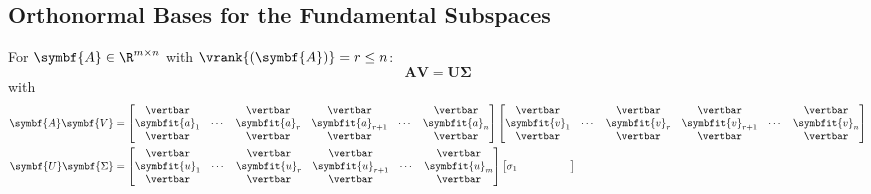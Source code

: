 \documentclass{article}
\begin{document}
\subsection{Orthonormal Bases for the Fundamental Subspaces}
For \(\symbf{A}\in\R^{m \times n}\) with \(\vrank{\left( \symbf{A} \right)} = r \leq n\):
\begin{equation*}
    \symbf{A} \symbf{V} = \symbf{U} \symbf{\Sigma}
\end{equation*}
with
\begin{align*}
    \symbf{A} \symbf{V}      & = \begin{bmatrix}
                                     \vertbar      &        & \vertbar      & \vertbar          &        & \vertbar      \\
                                     \symbfit{a}_1 & \cdots & \symbfit{a}_r & \symbfit{a}_{r+1} & \cdots & \symbfit{a}_n \\
                                     \vertbar      &        & \vertbar      & \vertbar          &        & \vertbar
                                 \end{bmatrix} \begin{bmatrix}
                                                   \vertbar      &        & \vertbar      & \vertbar          &        & \vertbar      \\
                                                   \symbfit{v}_1 & \cdots & \symbfit{v}_r & \symbfit{v}_{r+1} & \cdots & \symbfit{v}_n \\
                                                   \vertbar      &        & \vertbar      & \vertbar          &        & \vertbar
                                               \end{bmatrix} \\
    \symbf{U} \symbf{\Sigma} & = \begin{bmatrix}
                                     \vertbar      &        & \vertbar      & \vertbar          &        & \vertbar      \\
                                     \symbfit{u}_1 & \cdots & \symbfit{u}_r & \symbfit{u}_{r+1} & \cdots & \symbfit{u}_m \\
                                     \vertbar      &        & \vertbar      & \vertbar          &        & \vertbar
                                 \end{bmatrix} \begin{bmatrix}
                                                   \sigma_1 &        &          &   &        &   \\

\end{bmatrix}
\end{align*}
\end{document}
